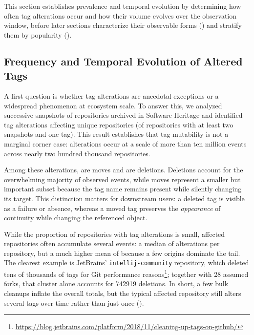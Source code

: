 This section establishes prevalence and temporal evolution by determining how often tag alterations occur and how their volume evolves over the observation window, before later sections characterize their observable forms () and stratify them by popularity ().

\subsection{Frequency and Temporal Evolution of Altered Tags}
\label{subsec:tags-freq}

A first question is whether tag alterations are anecdotal exceptions or a widespread phenomenon at ecosystem scale.
To answer this, we analyzed successive snapshots of repositories archived in Software Heritage and identified \TotalAlterations tag alterations affecting \AlteredRepositories unique repositories (\AlteredRepositoriesPercent of repositories with at least two snapshots and one tag).
This result establishes that tag mutability is not a marginal corner case: alterations occur at a scale of more than ten million events across nearly two hundred thousand repositories.

Among these alterations, \LegitMoves are moves and \Deletions are deletions.
Deletions account for the overwhelming majority of observed events, while moves represent a smaller but important subset because the tag name remains present while silently changing its target.
This distinction matters for downstream users: a deleted tag is visible as a failure or absence, whereas a moved tag preserves the \emph{appearance} of continuity while changing the referenced object.

While the proportion of repositories with tag alterations is small, affected repositories often accumulate several events: a median of \AlteredTagPerRepositoryMedian alterations per repository, but a much higher mean of \AlteredTagPerRepository because a few origins dominate the tail.
The clearest example is JetBrains' \texttt{intellij-community} repository, which deleted tens of thousands of tags for Git performance reasons\footnote{\url{https://blog.jetbrains.com/platform/2018/11/cleaning-up-tags-on-github/}}; together with 28 assumed forks, that cluster alone accounts for \num{742919} deletions.
In short, a few bulk cleanups inflate the overall totals, but the typical affected repository still alters several tags over time rather than just once ().


